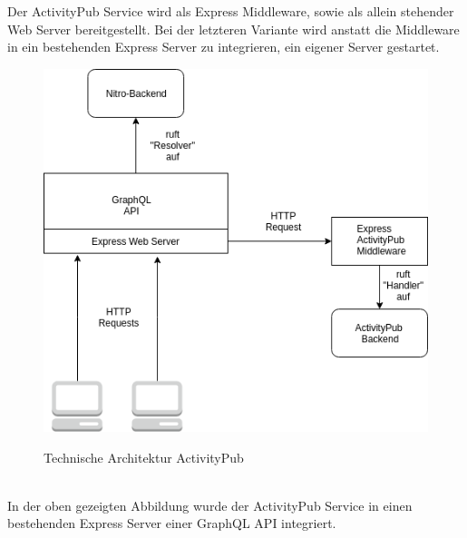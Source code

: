 	Der ActivityPub Service wird als Express Middleware, sowie als allein stehender Web Server bereitgestellt. Bei der letzteren Variante wird anstatt die Middleware in ein bestehenden Express Server zu integrieren, ein eigener Server gestartet.\\
	\begin{figure}[h]
		\centering
		\includegraphics[scale=0.6]{figures/technische-architektur-activitypub.png}
		\label{fig:tech-arch}
		\caption{Technische Architektur ActivityPub}
	\end{figure}\\
	In der oben gezeigten Abbildung wurde der ActivityPub Service in einen bestehenden Express Server einer GraphQL API integriert.\\
	

